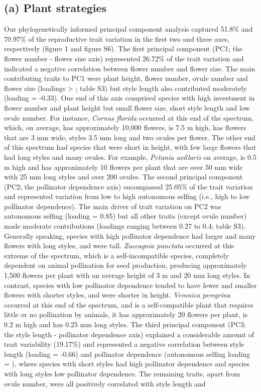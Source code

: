 \documentclass[
  12pt,
  a4paper,
]{article}
\begin{document}
\hypertarget{a-plant-strategies}{%
\subsection{(a) Plant strategies}\label{a-plant-strategies}}

Our phylogenetically informed principal component analysis captured 51.8\% and 70.97\% of the reproductive trait variation in the first two and three axes, respectively (figure 1 and figure S6). The first principal component (PC1; the flower number - flower size axis) represented 26.72\% of the trait variation and indicated a negative correlation between flower number and flower size. The main contributing traits to PC1 were plant height, flower number, ovule number and flower size (loadings \textgreater{} \textbar; table S3) but style length also contributed moderately (loading = -0.33). One end of this axis comprised species with high investment in flower number and plant height but small flower size, short style length and low ovule number. For instance, \emph{Cornus florida} occurred at this end of the spectrum, which, on average, has approximately 10,000 flowers, is 7.5 m high, has flowers that are 3 mm wide, styles 3.5 mm long and two ovules per flower. The other end of this spectrum had species that were short in height, with few large flowers that had long styles and many ovules. For example, \emph{Petunia axillaris} on average, is 0.5 m high and has approximately 10 flowers per plant that are over 50 mm wide with 25 mm long styles and over 200 ovules. The second principal component (PC2; the pollinator dependence axis) encompassed 25.05\% of the trait variation and represented variation from low to high autonomous selfing (i.e., high to low pollinator dependence). The main driver of trait variation on PC2 was autonomous selfing (loading = 0.85) but all other traits (except ovule number) made moderate contributions (loadings ranging between 0.27 to 0.4; table S3). Generally speaking, species with high pollinator dependence had larger and many flowers with long styles, and were tall. \emph{Zuccagnia punctata} occurred at this extreme of the spectrum, which is a self-incompatible species, completely dependent on animal pollination for seed production, producing approximately 1,500 flowers per plant with an average height of 3 m and 20 mm long styles. In contrast, species with low pollinator dependence tended to have fewer and smaller flowers with shorter styles, and were shorter in height. \emph{Veronica peregrina} occurred at this end of the spectrum, and is a self-compatible plant that requires little or no pollination by animals, it has approximately 20 flowers per plant, is 0.2 m high and has 0.25 mm long styles. The third principal component (PC3; the style length - pollinator dependence axis) explained a considerable amount of trait variability (19.17\%) and represented a negative correlation between style length (loading = -0.66) and pollinator dependence (autonomous selfing loading = \textbar), where species with short styles had high pollinator dependence and species with long styles low pollinator dependence. The remaining traits, apart from ovule number, were all positively correlated with style length and 
\end{document}
